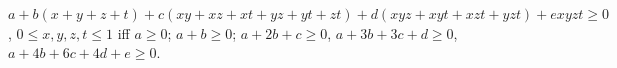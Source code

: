 $a + b(x + y + z + t) + c(xy + xz + xt + yz + yt + zt) + d(xyz + xyt + xzt + yzt) + exyzt \geq 0$, $0 \leq x, y, z, t \leq 1$ iff $a \geq 0$; $a + b \geq 0$; $a + 2b + c \geq 0$, $a + 3b + 3c + d \geq 0$, $a + 4b + 6c + 4d + e \geq 0$.

